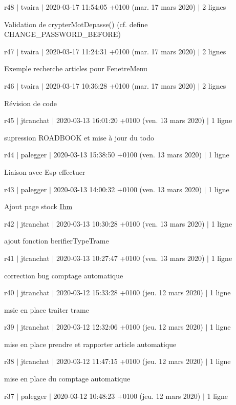 r48 $\vert$ tvaira $\vert$ 2020-\/03-\/17 11\+:54\+:05 +0100 (mar. 17 mars 2020) $\vert$ 2 lignes

Validation de crypter\+Mot\+Depasse() (cf. define C\+H\+A\+N\+G\+E\+\_\+\+P\+A\+S\+S\+W\+O\+R\+D\+\_\+\+B\+E\+F\+O\+RE)

r47 $\vert$ tvaira $\vert$ 2020-\/03-\/17 11\+:24\+:31 +0100 (mar. 17 mars 2020) $\vert$ 2 lignes

Exemple recherche articles pour Fenetre\+Menu

r46 $\vert$ tvaira $\vert$ 2020-\/03-\/17 10\+:36\+:28 +0100 (mar. 17 mars 2020) $\vert$ 2 lignes

Révision de code

r45 $\vert$ jtranchat $\vert$ 2020-\/03-\/13 16\+:01\+:20 +0100 (ven. 13 mars 2020) $\vert$ 1 ligne

supression R\+O\+A\+D\+B\+O\+OK et mise à jour du todo

r44 $\vert$ palegger $\vert$ 2020-\/03-\/13 15\+:38\+:50 +0100 (ven. 13 mars 2020) $\vert$ 1 ligne

Liaison avec Esp effectuer

r43 $\vert$ palegger $\vert$ 2020-\/03-\/13 14\+:00\+:32 +0100 (ven. 13 mars 2020) $\vert$ 1 ligne

Ajout page stock \hyperlink{class_ihm}{Ihm}

r42 $\vert$ jtranchat $\vert$ 2020-\/03-\/13 10\+:30\+:28 +0100 (ven. 13 mars 2020) $\vert$ 1 ligne

ajout fonction berifier\+Type\+Trame

r41 $\vert$ jtranchat $\vert$ 2020-\/03-\/13 10\+:27\+:47 +0100 (ven. 13 mars 2020) $\vert$ 1 ligne

correction bug comptage automatique

r40 $\vert$ jtranchat $\vert$ 2020-\/03-\/12 15\+:33\+:28 +0100 (jeu. 12 mars 2020) $\vert$ 1 ligne

msie en place traiter trame

r39 $\vert$ jtranchat $\vert$ 2020-\/03-\/12 12\+:32\+:06 +0100 (jeu. 12 mars 2020) $\vert$ 1 ligne

mise en place prendre et rapporter article automatique

r38 $\vert$ jtranchat $\vert$ 2020-\/03-\/12 11\+:47\+:15 +0100 (jeu. 12 mars 2020) $\vert$ 1 ligne

mise en place du comptage automatique

r37 $\vert$ palegger $\vert$ 2020-\/03-\/12 10\+:48\+:23 +0100 (jeu. 12 mars 2020) $\vert$ 1 ligne

